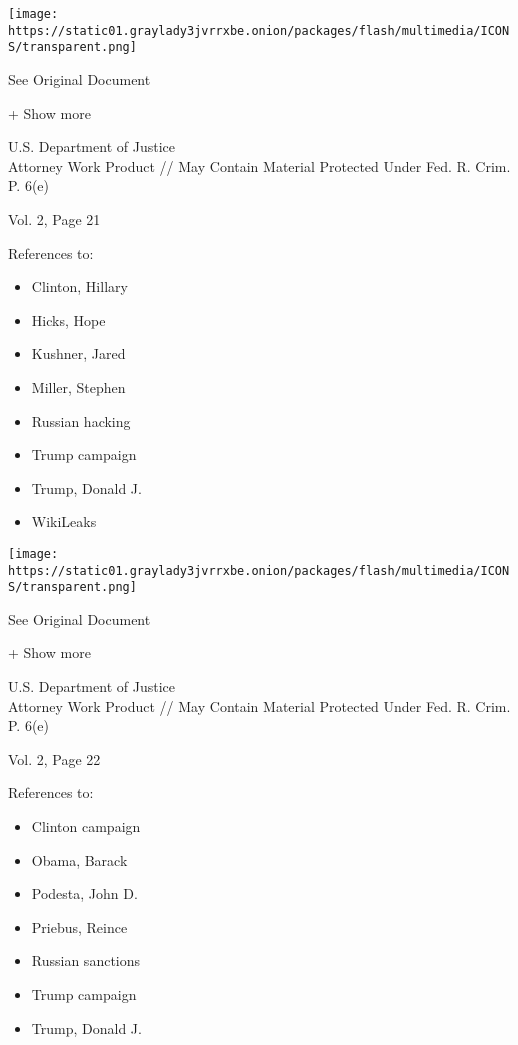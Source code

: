 \protect\hyperlink{}{}

\texttt{[image: https://static01.graylady3jvrrxbe.onion/packages/flash/multimedia/ICONS/transparent.png]}

See Original Document

+ Show more

U.S. Department of Justice\\
Attorney Work Product // May Contain Material Protected Under Fed. R.
Crim. P. 6(e)

Vol. 2, Page 21

References to:

\begin{itemize}
\tightlist
\item
  Clinton, Hillary
\item
  Hicks, Hope
\item
  Kushner, Jared
\item
  Miller, Stephen
\item
  Russian hacking
\item
  Trump campaign
\item
  Trump, Donald J.
\item
  WikiLeaks
\end{itemize}

\protect\hyperlink{}{}

\texttt{[image: https://static01.graylady3jvrrxbe.onion/packages/flash/multimedia/ICONS/transparent.png]}

See Original Document

+ Show more

U.S. Department of Justice\\
Attorney Work Product // May Contain Material Protected Under Fed. R.
Crim. P. 6(e)

Vol. 2, Page 22

References to:

\begin{itemize}
\tightlist
\item
  Clinton campaign
\item
  Obama, Barack
\item
  Podesta, John D.
\item
  Priebus, Reince
\item
  Russian sanctions
\item
  Trump campaign
\item
  Trump, Donald J.
\end{itemize}

\protect\hyperlink{}{}


